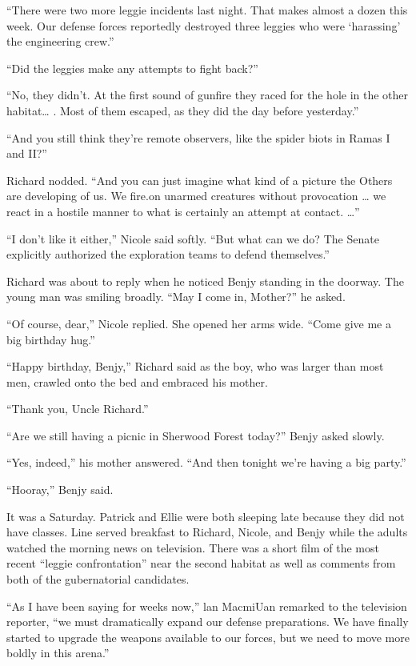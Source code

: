 \documentclass[]{article}
\begin{document}
{“There were two more leggie incidents last night. That makes almost a dozen this week. Our defense forces reportedly destroyed three leggies who were ‘harassing’ the engineering crew.”

“Did the leggies make any attempts to fight back?”

“No, they didn’t. At the first sound of gunfire they raced for the hole in the other habitat… . Most of them escaped, as they did the day before yesterday.”

“And you still think they’re remote observers, like the spider biots in Ramas I and II?”

Richard nodded. “And you can just imagine what kind of a picture the Others are developing of us. We fire.on unarmed creatures without provocation … we react in a hostile manner to what is certainly an attempt at contact. …”

“I don’t like it either,” Nicole said softly. “But what can we do? The Senate explicitly authorized the exploration teams to defend themselves.”

Richard was about to reply when he noticed Benjy standing in the doorway. The young man was smiling broadly. “May I come in, Mother?” he asked.

“Of course, dear,” Nicole replied. She opened her arms wide. “Come give me a big birthday hug.”

“Happy birthday, Benjy,” Richard said as the boy, who was larger than most men, crawled onto the bed and embraced his mother.

“Thank you, Uncle Richard.”

“Are we still having a picnic in Sherwood Forest today?” Benjy asked slowly.

“Yes, indeed,” his mother answered. “And then tonight we’re having a big party.”

“Hooray,” Benjy said.

It was a Saturday. Patrick and Ellie were both sleeping late because they did not have classes. Line served breakfast to Richard, Nicole, and Benjy while the adults watched the morning news on television. There was a short film of the most recent “leggie confrontation” near the second habitat as well as comments from both of the gubernatorial candidates.

“As I have been saying for weeks now,” lan MacmiUan remarked to the television reporter, “we must dramatically expand our defense preparations. We have finally started to upgrade the weapons available to our forces, but we need to move more boldly in this arena.”

}
\end{document}
